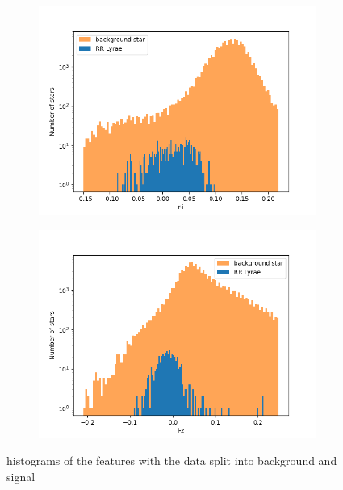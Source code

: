 \documentclass[%
 reprint,
 amsmath,amssymb,
 aps,
]{revtex4-2}
\begin{document}
\begin{figure}
 	\begin{subfigure}[b]{0.4\textwidth}   
 		\centering 
 		\includegraphics[width=\textwidth]{figs/hist_xData_feature2_labelSplit.png}
 		\label{fig:mean and std of net34}
 	\end{subfigure}
 	\hfill
 	\begin{subfigure}[b]{0.4\textwidth}   
 		\centering 
 		\includegraphics[width=\textwidth]{figs/hist_xData_feature3_labelSplit.png}
 		\label{fig:mean and std of net44}
 	\end{subfigure}
 	\caption[ histograms of the features with the data split into background and signal ]
 	{\small histograms of the features with the data split into background and signal} 
 	\label{fig:features}
 \end{figure}
 
\end{document}
